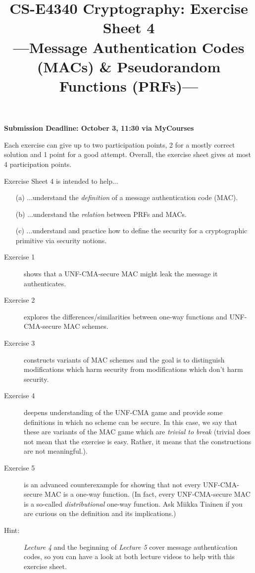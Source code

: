 \documentclass[envcountsame,runningheads,notitlepage]{../llncs}
\title{CS-E4340 Cryptography: Exercise Sheet 4\\[0.5\baselineskip]
\normalsize ---Message Authentication Codes (MACs) \& Pseudorandom Functions (PRFs)---}
\author{}\institute{}
\theoremstyle{definition}
\begin{document}
\maketitle

\noindent
\textbf{Submission Deadline: October 3, 11:30 via MyCourses}

\medskip
\noindent
Each exercise can give up to two participation points, 2 for a mostly correct solution and 1 point for a good attempt. Overall, the exercise sheet gives at most 4 participation points.



\medskip
\noindent
Exercise Sheet 4 is intended to help...
\begin{itemize}
\item[(a)] ...understand the \emph{definition} of a message authentication code (MAC).
\item[(b)] ...understand the \emph{relation} between PRFs and MACs.
\item[(c)] ...understand and practice how to define the security for a cryptographic primitive via security notions.
\end{itemize}

\begin{description}
\item[Exercise 1] shows that a UNF-CMA-secure MAC might leak the message it authenticates.
\item[Exercise 2] explores the differences/similarities between one-way functions and UNF-CMA-secure MAC schemes.
\item[Exercise 3] constructs variants of MAC schemes and the goal is to distinguish modifications which harm security from modifications which don't harm security.
\item[Exercise 4] deepens understanding of the UNF-CMA game and provide some definitions in which no scheme can be secure. In this case, we say that these are variants of the MAC game which are \emph{trivial to break} (trivial does not mean that the exercise is easy. Rather, it means that the constructions are not meaningful.).
\item[Exercise 5] is an advanced counterexample for showing that not every UNF-CMA-secure MAC is a one-way function. (In fact, every UNF-CMA-secure MAC is a so-called \emph{distributional} one-way function. Ask Miikka Tiainen if you are curious on the definition and its implications.)
\item[Hint:] \emph{Lecture 4} and the beginning of \emph{Lecture 5} cover message authentication codes, so you can have a look at both lecture videos to help with this exercise sheet.
\end{description}
\end{document}
